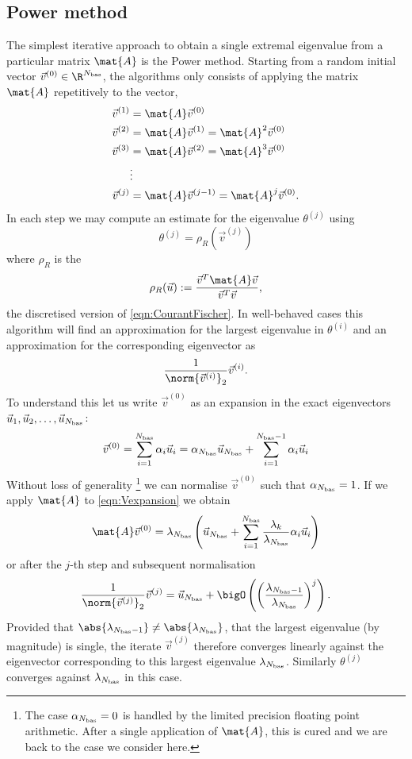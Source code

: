 \subsection{Power method}
\label{sec:Power}
The simplest iterative approach to obtain a single extremal eigenvalue
from a particular matrix $\mat{A}$ is the Power method.
Starting from a random initial vector $\vec{v}^{(0)} \in \R^{\Nbas}$,
the algorithms only consists of applying the matrix $\mat{A}$
repetitively to the vector, \ie
\begin{align*}
	\vec{v}^{(1)} &= \mat{A} \vec{v}^{(0)} \\
	\vec{v}^{(2)} &= \mat{A} \vec{v}^{(1)} = \mat{A}^2 \vec{v}^{(0)} \\
	\vec{v}^{(3)} &= \mat{A} \vec{v}^{(2)} = \mat{A}^3 \vec{v}^{(0)} \\
	&\vdots \\
	\vec{v}^{(j)} &= \mat{A} \vec{v}^{(j-1)} = \mat{A}^j \vec{v}^{(0)}.
\end{align*}
In each step we may compute an estimate for the eigenvalue $\theta^{(j)}$ using
\begin{equation}
	\theta^{(j)} = \rho_R\left(\vec{v}^{(j)}\right)
	\label{eqn:RitzValue}
\end{equation}
where $\rho_R$ is the
\begin{equation}
	 \rho_R(\vec{u}) := \frac{\vec{v}^T \mat{A} \vec{v}}{\vec{v}^T \vec{v}},
	\label{eqn:RayleighQuotient}
\end{equation}
the discretised version of \eqref{eqn:CourantFischer}.
In well-behaved cases this algorithm will find an approximation for
the largest eigenvalue in $\theta^{(i)}$
and an approximation for the corresponding eigenvector as
\[ \frac{1}{\norm{\vec{v}^{(i)}}_2}  \vec{v}^{(i)}. \]
To understand this
let us write $\vec{v}^{(0)}$ as an expansion in the exact
eigenvectors \linebreak $\vec{u}_1, \vec{u}_2, \ldots, \vec{u}_{N_\text{bas}}$:
\begin{equation}
	\vec{v}^{(0)} = \sum_{i=1}^{N_\text{bas}} \alpha_i \vec{u}_i = \alpha_{N_\text{bas}} \vec{u}_{N_\text{bas}} + \sum_{i=1}^{N_\text{bas}-1} \alpha_i \vec{u}_i
	\label{eqn:Vexpansion}
\end{equation}
Without loss of generality%
\footnote{The case $\alpha_{N_\text{bas}} = 0$ is handled by the limited precision
floating point arithmetic. After a single application of $\mat{A}$,
this is cured and we are back to the case we consider here.}
we can normalise $\vec{v}^{(0)}$ such that $\alpha_{N_\text{bas}} = 1$.
If we apply $\mat{A}$ to \eqref{eqn:Vexpansion} we obtain
\[
	\mat{A} \vec{v}^{(0)} = \lambda_{\Nbas} \left( \vec{u}_{\Nbas} + \sum_{i=1}^{\Nbas}
	\frac{\lambda_k}{\lambda_{\Nbas}}
	\alpha_i \vec{u}_i \right)
\]
or after the $j$-th step and subsequent normalisation
\[
	\frac{1}{\norm{\vec{v}^{(j)}}_2} \vec{v}^{(j)} =
	\vec{u}_{\Nbas} + \bigO\left(
	\left( \frac{\lambda_{\Nbas-1}}{\lambda_{\Nbas}} \right)^j
	\right).
\]
Provided that $\abs{\lambda_{\Nbas-1}} \neq \abs{\lambda_{\Nbas}}$,
\ie that the largest eigenvalue (by magnitude) is single,
the iterate $\vec{v}^{(j)}$
therefore converges linearly against the eigenvector corresponding to this
largest eigenvalue $\lambda_{N_\text{bas}}$.
Similarly $\theta^{(j)}$ converges against $\lambda_{N_\text{bas}}$ in this case.

